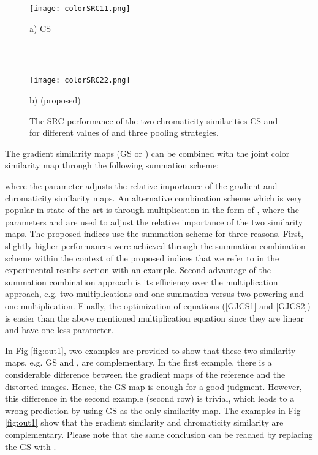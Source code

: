 \begin{figure}[htb]
\scriptsize
\begin{minipage}[b]{0.99\linewidth}
  \centering
  \centerline{\texttt{[image: colorSRC11.png]}} 
  \vspace{0.10cm}
\centerline{a) CS}
\end{minipage}
\\ \\
\begin{minipage}[b]{.99\linewidth}
  \centering
  \centerline{\texttt{[image: colorSRC22.png]}}
  \vspace{0.10cm}
\centerline{b)  (proposed)}
\end{minipage}
\caption{The SRC performance of the two chromaticity similarities CS and  for different values of  and three pooling strategies.}
\label{CSJCS}
\end{figure}


The gradient similarity maps (GS or ) can be combined with the joint color similarity map  through the following summation scheme:       
 
 
where the parameter  adjusts the relative importance of the gradient and chromaticity similarity maps. An alternative combination scheme which is very popular in state-of-the-art is through multiplication in the form of , where the parameters  and  are used to adjust the relative importance of the two similarity maps. The proposed indices use the summation scheme for three reasons. First, slightly higher performances were achieved through the summation combination scheme within the context of the proposed indices that we refer to in the experimental results section with an example. Second advantage of the summation combination approach is its efficiency over the multiplication approach, e.g. two multiplications and one summation versus two powering and one multiplication. Finally, the optimization of equations (\ref{GJCS1} and \ref{GJCS2}) is easier than the above mentioned multiplication equation since they are linear and have one less parameter.  
        


In Fig \ref{fig:out1}, two examples are provided to show that these two similarity maps, e.g. GS and , are complementary. In the first example, there is a considerable difference between the gradient maps of the reference and the distorted images. Hence, the GS map is enough for a good judgment. However, this difference in the second example (second row) is trivial, which leads to a wrong prediction by using GS as the only similarity map. The examples in Fig \ref{fig:out1} show that the gradient similarity and chromaticity similarity are complementary. Please note that the same conclusion can be reached by replacing the GS with .       





